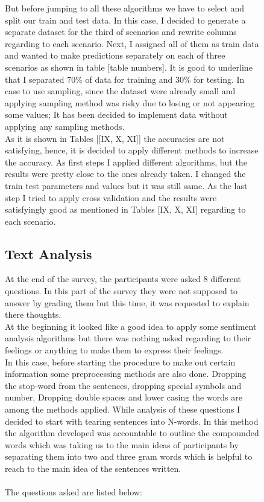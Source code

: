 \documentclass[letterpaper, 10 pt, conference]{ieeeconf}
\begin{document}
\begin{figure}
But before jumping to all these algorithms we have to select and split our train and test data. In this case, I decided to generate a separate dataset for the third of scenarios and rewrite columns regarding to each scenario. Next, I assigned all of them as train data and wanted to make predictions separately on each of three scenarios as shown in table [table numbers]. It is good to underline that I separated 70\% of data for training and 30\% for testing. 
In case to use sampling, since the dataset were already small and applying sampling method was risky due to losing or not appearing some values; It has been decided to implement data without applying any sampling methods. \\
As it is shown in Tables [[IX, X, XI]] the accuracies are not satisfying, hence, it is decided to apply different methods to increase the accuracy. As first steps I applied different algorithms, but the results were pretty close to the ones already taken. I changed the train test parameters and values but it was still same. As the last step I tried to apply cross validation and the results were satisfyingly good as mentioned in Tables [IX, X, XI] regarding to each scenario.



\subsection{Text Analysis}
At the end of the survey, the participants were asked 8 different questions. In this part of the survey they were not supposed to answer by grading them but this time, it was requested to explain there thoughts. \\
At the beginning it looked like a good idea to apply some sentiment analysis algorithms but there was nothing asked regarding to their feelings or anything to make them to express their feelings. \\
In this case, before starting the procedure to make out certain information some preprocessing methods are also done. Dropping the stop-word from the sentences, dropping special symbols and number, Dropping double spaces and lower casing the words are among the methods applied.
While analysis of these questions I  decided to start with tearing sentences into N-words. In this method the algorithm developed was accountable to outline the compounded words which was taking us to the main ideas of participants by separating them into two and three gram words which is helpful to reach to the main idea of the sentences written.\\\\
The questions asked are listed below:



\end{figure}
\end{document}
